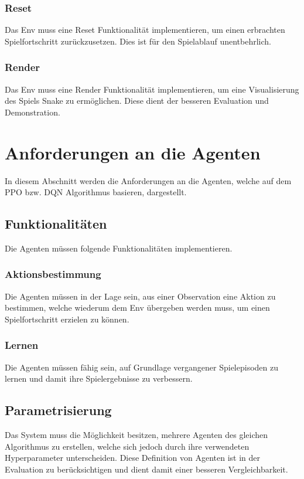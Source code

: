 \subsubsection{Reset} \label{subsubsec:Anforderungen_Reset}
Das Env muss eine Reset Funktionalität implementieren, um einen erbrachten Spielfortschritt zurückzusetzen. Dies ist für den Spielablauf unentbehrlich.

\subsubsection{Render} \label{subsubsec:Anforderungen_Render}
Das Env muss eine Render Funktionalität implementieren, um eine Visualisierung des Spiels Snake zu ermöglichen. Diese dient der besseren Evaluation und Demonstration.

\section{Anforderungen an die Agenten} \label{sec:Anforderungen_Agenten}
In diesem Abschnitt werden die Anforderungen an die Agenten, welche auf dem PPO bzw. DQN Algorithmus basieren, dargestellt.

\subsection{Funktionalitäten} \label{subsec:Anforderungen_Funktionalitäten_Agent}
Die Agenten müssen folgende Funktionalitäten implementieren.

\subsubsection{Aktionsbestimmung} \label{subsubsec:Anforderungen_Aktionsbestimmung}
Die Agenten müssen in der Lage sein, aus einer Observation eine Aktion zu bestimmen, welche wiederum dem Env übergeben werden muss, um einen Spielfortschritt erzielen zu können.

\subsubsection{Lernen} \label{subsubsec:Anforderungen_Lernen}
Die Agenten müssen fähig sein, auf Grundlage vergangener Spielepisoden zu lernen und damit ihre Spielergebnisse zu verbessern.

\subsection{Parametrisierung} \label{subsec:Anforderungen_Parametrisierung}
Das System muss die Möglichkeit besitzen, mehrere Agenten des gleichen Algorithmus zu erstellen, welche sich jedoch durch ihre verwendeten Hyperparameter unterscheiden. Diese Definition von Agenten ist in der Evaluation zu berücksichtigen und dient damit einer besseren Vergleichbarkeit.

